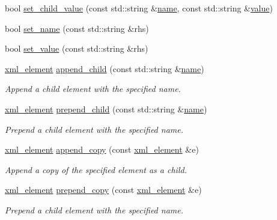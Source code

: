 \begin{DoxyCompactItemize}
\item 
bool \hyperlink{classlsl_1_1xml__element_a6fe187e03b36cf8fd5f9d3892e99453f}{set\+\_\+child\+\_\+value} (const std\+::string \&\hyperlink{classlsl_1_1xml__element_a2e449e85b7e763b1d0db4bb19d2eb7c2}{name}, const std\+::string \&\hyperlink{classlsl_1_1xml__element_a1a5e666b35c5d7262e4ffbda86b57f73}{value})
\item 
bool \hyperlink{classlsl_1_1xml__element_a8ddf2b35719b273dbb5700f16a2da4e5}{set\+\_\+name} (const std\+::string \&rhs)
\item 
bool \hyperlink{classlsl_1_1xml__element_a3a3bbf2468ba3abd9309764faa61a7a4}{set\+\_\+value} (const std\+::string \&rhs)
\item 
\hyperlink{classlsl_1_1xml__element}{xml\+\_\+element} \hyperlink{classlsl_1_1xml__element_af56c7976bb62cabc9c0ca69502063fea}{append\+\_\+child} (const std\+::string \&\hyperlink{classlsl_1_1xml__element_a2e449e85b7e763b1d0db4bb19d2eb7c2}{name})
\begin{DoxyCompactList}\small\item\em Append a child element with the specified name. \end{DoxyCompactList}\item 
\hyperlink{classlsl_1_1xml__element}{xml\+\_\+element} \hyperlink{classlsl_1_1xml__element_abd881c6c5d0d381f9efff2fc25975e7e}{prepend\+\_\+child} (const std\+::string \&\hyperlink{classlsl_1_1xml__element_a2e449e85b7e763b1d0db4bb19d2eb7c2}{name})
\begin{DoxyCompactList}\small\item\em Prepend a child element with the specified name. \end{DoxyCompactList}\item 
\hyperlink{classlsl_1_1xml__element}{xml\+\_\+element} \hyperlink{classlsl_1_1xml__element_a73fc3bfe22e1117907a2d80ba33d2208}{append\+\_\+copy} (const \hyperlink{classlsl_1_1xml__element}{xml\+\_\+element} \&e)
\begin{DoxyCompactList}\small\item\em Append a copy of the specified element as a child. \end{DoxyCompactList}\item 
\hyperlink{classlsl_1_1xml__element}{xml\+\_\+element} \hyperlink{classlsl_1_1xml__element_a1bea6df95134f909611b1c40218828d7}{prepend\+\_\+copy} (const \hyperlink{classlsl_1_1xml__element}{xml\+\_\+element} \&e)
\begin{DoxyCompactList}\small\item\em Prepend a child element with the specified name. \end{DoxyCompactList}\item 

\end{DoxyCompactItemize}

